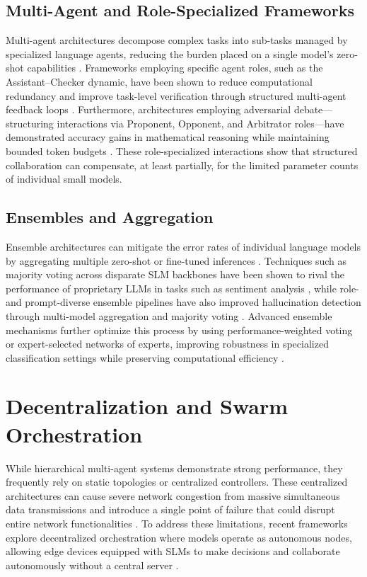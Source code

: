 \subsection{Multi-Agent and Role-Specialized Frameworks}
Multi-agent architectures decompose complex tasks into sub-tasks managed by specialized language agents, reducing the burden placed on a single model's zero-shot capabilities \cite{multiagent2025, shao2025dot, pacheco2025flight}. Frameworks employing specific agent roles, such as the Assistant--Checker dynamic, have been shown to reduce computational redundancy and improve task-level verification through structured multi-agent feedback loops \cite{resiliomate2025}. Furthermore, architectures employing adversarial debate---structuring interactions via Proponent, Opponent, and Arbitrator roles---have demonstrated accuracy gains in mathematical reasoning while maintaining bounded token budgets \cite{debateagents2025}. These role-specialized interactions show that structured collaboration can compensate, at least partially, for the limited parameter counts of individual small models.

\subsection{Ensembles and Aggregation}
Ensemble architectures can mitigate the error rates of individual language models by aggregating multiple zero-shot or fine-tuned inferences \cite{sentensemble2026, compos2024}. Techniques such as majority voting across disparate SLM backbones have been shown to rival the performance of proprietary LLMs in tasks such as sentiment analysis \cite{sentensemble2026}, while role- and prompt-diverse ensemble pipelines have also improved hallucination detection through multi-model aggregation and majority voting \cite{compos2024}. Advanced ensemble mechanisms further optimize this process by using performance-weighted voting or expert-selected networks of experts, improving robustness in specialized classification settings while preserving computational efficiency \cite{tcm2025, textnex2025}.

\section{Decentralization and Swarm Orchestration}
While hierarchical multi-agent systems demonstrate strong performance, they frequently rely on static topologies or centralized controllers. These centralized architectures can cause severe network congestion from massive simultaneous data transmissions and introduce a single point of failure that could disrupt entire network functionalities \cite{egi2025}. To address these limitations, recent frameworks explore decentralized orchestration where models operate as autonomous nodes, allowing edge devices equipped with SLMs to make decisions and collaborate autonomously without a central server \cite{egi2025}.

